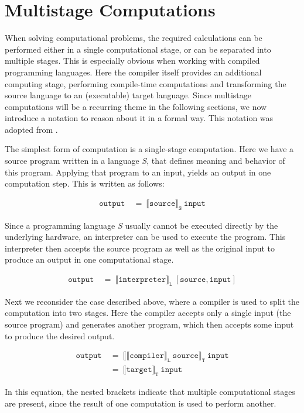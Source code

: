
\section{Multistage Computations}\label{sec:multistage}

When solving computational problems, the required calculations can be performed either in a single computational stage, or can be separated into multiple stages.
This is especially obvious when working with compiled programming languages.
Here the compiler itself provides an additional computing stage, performing compile-time computations and transforming the source language to an (executable) target language.
Since multistage computations will be a recurring theme in the following sections, we now introduce a notation to reason about it in a formal way. This notation was adopted from . %

The simplest form of computation is a single-stage computation.
Here we have a source program written in a language \textit{S}, that defines meaning and behavior of this program.
Applying that program to an input, yields an output in one computation step.
This is written as follows:

\begin{align*}
  \mathtt{output}\ &=\ \llbracket \mathtt{source} \rrbracket_{\mathtt{S}}\ \mathtt{input}
\end{align*}

Since a programming language \textit{S} usually cannot be executed directly by the underlying hardware, an interpreter can be used to execute the program.
This interpreter then accepts the source program as well as the original input to produce an output in one computational stage.

\begin{align*}
  \mathtt{output}\ &=\ \llbracket \mathtt{interpreter} \rrbracket_{\mathtt{L}}\ [\mathtt{source}, \mathtt{input}]
\end{align*}

Next we reconsider the case described above, where a compiler is used to split the computation into two stages.
Here the compiler accepts only a single input (the source program) and generates another program, which then accepts some input to produce the desired output.

\begin{align*}
  \mathtt{output}\ &=\ \llbracket \llbracket \mathtt{compiler} \rrbracket_{\mathtt{L}}\ \mathtt{source} \rrbracket_{\mathtt{T}}\ \mathtt{input} \\
  &=\ \llbracket \mathtt{target} \rrbracket_{\mathtt{T}}\ \mathtt{input}
\end{align*}

In this equation, the nested brackets indicate that multiple computational stages are present, since the result of one computation is used to perform another.



